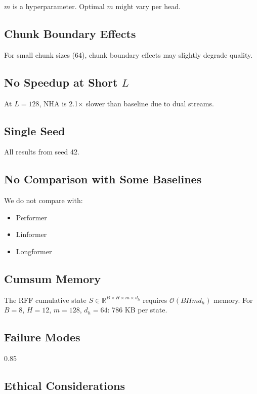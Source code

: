 $m$ is a hyperparameter. Optimal $m$ might vary per head.

\subsection{Chunk Boundary Effects}

For small chunk sizes (64), chunk boundary effects may slightly degrade 
quality.

\subsection{No Speedup at Short $L$}

At $L = 128$, NHA is 2.1$\times$ slower than baseline due to dual 
streams.

\subsection{Single Seed}

All results from seed 42.

\subsection{No Comparison with Some Baselines}

We do not compare with:
\begin{itemize}
\item Performer
\item Linformer
\item Longformer

\end{itemize}
\subsection{Cumsum Memory}

The RFF cumulative state $S \in \mathbb{R}^{B \times H \times m \times d_h}$ 
requires $\mathcal{O}(B H m d_h)$ memory. For $B=8$, $H=12$, $m=128$, 
$d_h=64$: 786 KB per state.

\subsection{Failure Modes}

0.85

\subsection{Ethical Considerations}

